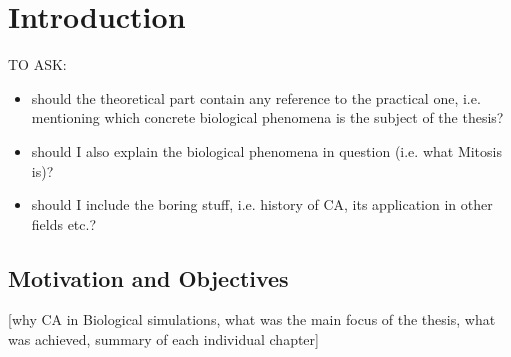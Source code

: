 \documentclass[../projekt.tex]{subfiles}
\begin{document}

\chapter{Introduction}
\label{chap-intro}

\noindent TO ASK: 
\begin{itemize}
	\item should the theoretical part contain any reference to the practical one, i.e. mentioning which concrete biological phenomena is the subject of the thesis?
	\item should I also explain the biological phenomena in question (i.e. what Mitosis is)?
	\item should I include the boring stuff, i.e. history of CA, its application in other fields etc.?
\end{itemize}

\section{Motivation and Objectives}
[why CA in Biological simulations, what was the main focus of the thesis, what was achieved, summary of each individual chapter]

\end{document}
